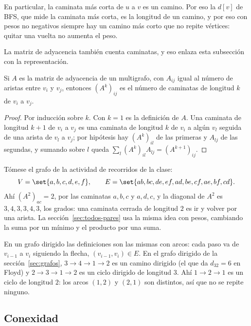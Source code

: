 \documentclass[11pt,letterpaper]{article}
\begin{document}
En particular, la caminata más corta de $u$ a $v$ es un camino. Por
eso la $d[v]$ de BFS, que mide la caminata más corta, es la longitud
de un camino, y por eso con pesos no negativos siempre hay un camino
más corto que no repite vértices: quitar una vuelta no aumenta el
peso.

La matriz de adyacencia también cuenta caminatas, y eso enlaza esta
subsección con la representación.

\begin{proposicion}
  \label{prop:potencias-adyacencia}
  Si $A$ es la matriz de adyacencia de un multigrafo, con $A_{ij}$
  igual al número de aristas entre $v_i$ y $v_j$, entonces
  $(A^{k})_{ij}$ es el número de caminatas de longitud $k$ de $v_i$ a
  $v_j$.
\end{proposicion}

\begin{proof}
  Por inducción sobre $k$. Con $k = 1$ es la definición de $A$. Una
  caminata de longitud $k + 1$ de $v_i$ a $v_j$ es una caminata de
  longitud $k$ de $v_i$ a algún $v_l$ seguida de una arista de $v_l$ a
  $v_j$; por hipótesis hay $(A^{k})_{il}$ de las primeras y $A_{lj}$
  de las segundas, y sumando sobre $l$ queda
  $\sum_{l} (A^{k})_{il} A_{lj} = (A^{k+1})_{ij}$.
\end{proof}

Tómese el grafo de la actividad de recorridos de la clase:
\[
  V = \set{a, b, c, d, e, f} , \qquad
  E = \set{ab, bc, de, ef, ad, be, cf, ae, bf, cd} .
\]
Ahí $(A^{2})_{ac} = 2$, por las caminatas $a, b, c$ y $a, d, c$, y la
diagonal de $A^{2}$ es $3, 4, 3, 3, 4, 3$, los grados: una caminata
cerrada de longitud $2$ es ir y volver por una arista. La
sección~\ref{sec:todos-pares} usa la misma idea con pesos, cambiando
la suma por un mínimo y el producto por una suma.

En un grafo dirigido las definiciones son las mismas con arcos: cada
paso va de $v_{i-1}$ a $v_i$ siguiendo la flecha, $(v_{i-1}, v_i) \in
E$. En el grafo dirigido de la sección~\ref{sec:grafos},
$3 \to 4 \to 1 \to 2$ es un camino dirigido (el que da $d_{32} = 6$
en Floyd) y $2 \to 3 \to 1 \to 2$ es un ciclo dirigido de longitud
$3$. Ahí $1 \to 2 \to 1$ es un ciclo de longitud $2$: los arcos
$(1, 2)$ y $(2, 1)$ son distintos, así que no se repite ninguno.


\subsection*{Conexidad}
\end{document}
